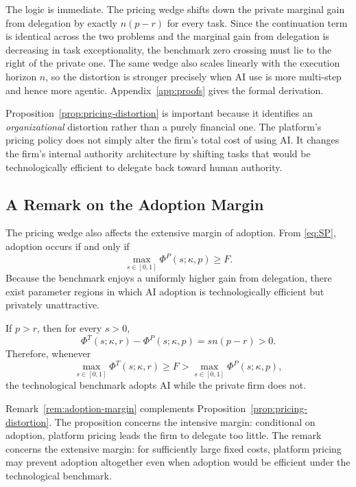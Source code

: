 The logic is immediate. The pricing wedge shifts down the private marginal gain from delegation by exactly $n(p-r)$ for every task. Since the continuation term is identical across the two problems and the marginal gain from delegation is decreasing in task exceptionality, the benchmark zero crossing must lie to the right of the private one. The same wedge also scales linearly with the execution horizon $n$, so the distortion is stronger precisely when AI use is more multi-step and hence more agentic. Appendix~\ref{app:proofs} gives the formal derivation.

Proposition~\ref{prop:pricing-distortion} is important because it identifies an \emph{organizational} distortion rather than a purely financial one. The platform's pricing policy does not simply alter the firm's total cost of using AI. It changes the firm's internal authority architecture by shifting tasks that would be technologically efficient to delegate back toward human authority.

\subsection{A Remark on the Adoption Margin}
\label{subsec:adoption-margin}

The pricing wedge also affects the extensive margin of adoption. From \eqref{eq:SP}, adoption occurs if and only if
\[
\max_{s\in[0,1]} \Phi^P(s;\kappa,p)\ge F.
\]
Because the benchmark enjoys a uniformly higher gain from delegation, there exist parameter regions in which AI adoption is technologically efficient but privately unattractive.

\begin{remark}
\label{rem:adoption-margin}
If $p>r$, then for every $s>0$,
\[
\Phi^T(s;\kappa,r)-\Phi^P(s;\kappa,p)=sn(p-r)>0.
\]
Therefore, whenever
\[
\max_{s\in[0,1]} \Phi^T(s;\kappa,r)\ge F>\max_{s\in[0,1]} \Phi^P(s;\kappa,p),
\]
the technological benchmark adopts AI while the private firm does not.
\end{remark}

Remark~\ref{rem:adoption-margin} complements Proposition~\ref{prop:pricing-distortion}. The proposition concerns the intensive margin: conditional on adoption, platform pricing leads the firm to delegate too little. The remark concerns the extensive margin: for sufficiently large fixed costs, platform pricing may prevent adoption altogether even when adoption would be efficient under the technological benchmark.
